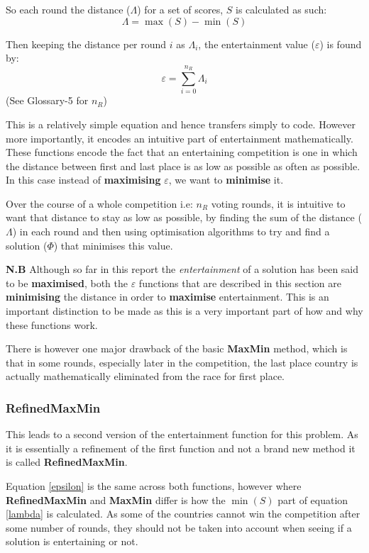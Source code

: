 \documentclass[12pt]{report}
\begin{document}
So each round the distance ($\Lambda$) for a set of scores, $S$ is calculated as such:
\begin{equation}\label{lambda}
	\Lambda = \max(S) - \min(S)
\end{equation}

Then keeping the distance per round $i$ as $\Lambda_i$, the entertainment value ($\varepsilon$) is found by:
\begin{equation}\label{epsilon}
	\varepsilon = \sum_{i=0}^{n_R}  \Lambda_i
\end{equation}
(See Glossary-5 for $n_{R}$)

This is a relatively simple equation and hence transfers simply to code. However more importantly, it encodes an intuitive part of entertainment mathematically. These functions encode the fact that an entertaining competition is one in which the distance between first and last place is as low as possible as often as possible. In this case instead of \textbf{maximising} $\varepsilon$, we want to \textbf{minimise} it.

Over the course of a whole competition i.e: $n_R$ voting rounds, it is intuitive to want that distance to stay as low as possible, by finding the sum of the distance ($\Lambda$) in each round and then using optimisation algorithms to try and find a solution ($\Phi$) that minimises this value.

\textbf{N.B} Although so far in this report the \textit{entertainment} of a solution has been said to be \textbf{maximised}, both the $\varepsilon$ functions that are described in this section are \textbf{minimising} the distance in order to \textbf{maximise} entertainment. This is an important distinction to be made as this is a very important part of how and why these functions work.

There is however one major drawback of the basic \textbf{MaxMin} method, which is that in some rounds, especially later in the competition, the last place country is actually mathematically eliminated from the race for first place.

\subsubsection{RefinedMaxMin}
This leads to a second version of the entertainment function for this problem. As it is essentially a refinement of the first function and not a brand new method it is called \textbf{RefinedMaxMin}.

Equation \ref{epsilon} is the same across both functions, however where \textbf{RefinedMaxMin} and \textbf{MaxMin} differ is how the $\min(S)$ part of equation \ref{lambda} is calculated. As some of the countries cannot win the competition after some number of rounds, they should not be taken into account when seeing if a solution is entertaining or not.
\end{document}
